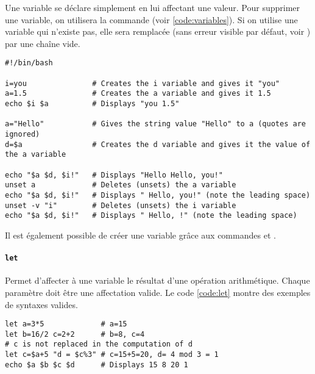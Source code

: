 Une variable se déclare simplement en lui affectant une valeur. Pour supprimer une variable, on utilisera la commande  (voir \ref{code:variables}). Si on utilise une variable qui n'existe pas, elle sera remplacée (sans erreur visible par défaut, voir ) par une chaîne vide.
\begin{code}
    \begin{verbatim}
#!/bin/bash

i=you               # Creates the i variable and gives it "you"
a=1.5               # Creates the a variable and gives it 1.5
echo $i $a          # Displays "you 1.5"

a="Hello"           # Gives the string value "Hello" to a (quotes are ignored)
d=$a                # Creates the d variable and gives it the value of the a variable

echo "$a $d, $i!"   # Displays "Hello Hello, you!"
unset a             # Deletes (unsets) the a variable
echo "$a $d, $i!"   # Displays " Hello, you!" (note the leading space)
unset -v "i"        # Deletes (unsets) the i variable
echo "$a $d, $i!"   # Displays " Hello, !" (note the leading space)
    \end{verbatim}

    \vspace{-0.5cm}
    \label{code:variables}
\end{code}

Il est également possible de créer une variable grâce aux commandes  et .
\paragraph{\texttt{let}} 
Permet d'affecter à une variable le résultat d'une opération arithmétique.
Chaque paramètre doit être une affectation valide. Le code \ref{code:let} montre des exemples de syntaxes valides.
\begin{code}
    \begin{verbatim}
let a=3*5             # a=15
let b=16/2 c=2+2      # b=8, c=4
# c is not replaced in the computation of d
let c=$a+5 "d = $c%3" # c=15+5=20, d= 4 mod 3 = 1
echo $a $b $c $d      # Displays 15 8 20 1
    \end{verbatim}
    
    \vspace{-0.5cm}
    \label{code:let}
\end{code}

